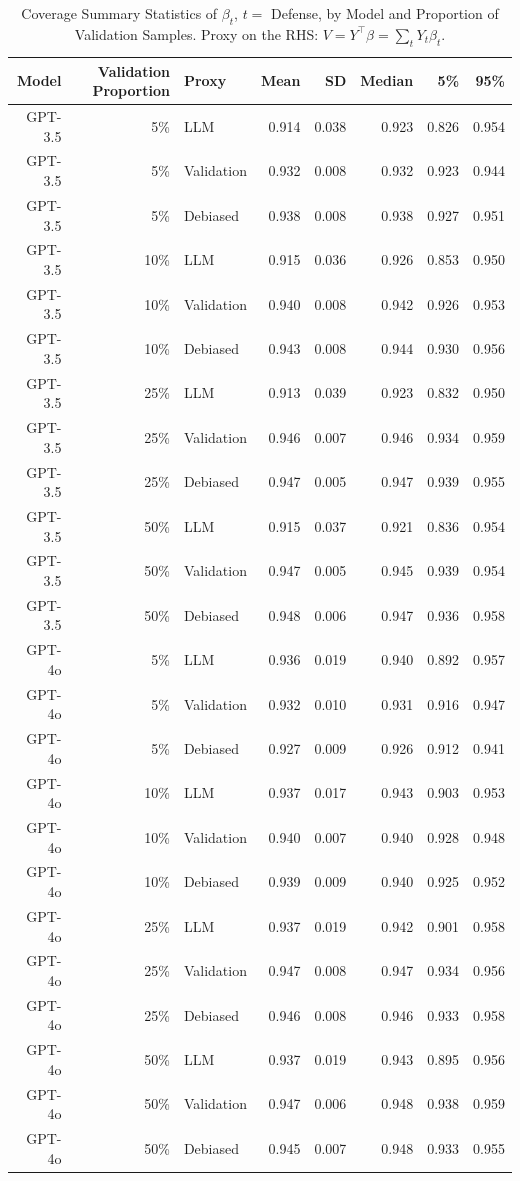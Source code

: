 \begin{table}

\caption{Coverage Summary Statistics of $\beta_{t}$, $t=$ Defense, by Model and Proportion of Validation Samples. Proxy on the RHS: $V = Y^\top \beta = \sum_{t} Y_t \beta_t$.}
\centering
\begin{tabular}[t]{rrlrrrrr}
\toprule
Model & Validation Proportion & Proxy & Mean & SD & Median & 5\% & 95\%\\
\midrule
GPT-3.5 & 5\% & LLM & 0.914 & 0.038 & 0.923 & 0.826 & 0.954\\
GPT-3.5 & 5\% & Validation & 0.932 & 0.008 & 0.932 & 0.923 & 0.944\\
GPT-3.5 & 5\% & Debiased & 0.938 & 0.008 & 0.938 & 0.927 & 0.951\\
GPT-3.5 & 10\% & LLM & 0.915 & 0.036 & 0.926 & 0.853 & 0.950\\
GPT-3.5 & 10\% & Validation & 0.940 & 0.008 & 0.942 & 0.926 & 0.953\\
GPT-3.5 & 10\% & Debiased & 0.943 & 0.008 & 0.944 & 0.930 & 0.956\\
GPT-3.5 & 25\% & LLM & 0.913 & 0.039 & 0.923 & 0.832 & 0.950\\
GPT-3.5 & 25\% & Validation & 0.946 & 0.007 & 0.946 & 0.934 & 0.959\\
GPT-3.5 & 25\% & Debiased & 0.947 & 0.005 & 0.947 & 0.939 & 0.955\\
GPT-3.5 & 50\% & LLM & 0.915 & 0.037 & 0.921 & 0.836 & 0.954\\
GPT-3.5 & 50\% & Validation & 0.947 & 0.005 & 0.945 & 0.939 & 0.954\\
GPT-3.5 & 50\% & Debiased & 0.948 & 0.006 & 0.947 & 0.936 & 0.958\\
GPT-4o & 5\% & LLM & 0.936 & 0.019 & 0.940 & 0.892 & 0.957\\
GPT-4o & 5\% & Validation & 0.932 & 0.010 & 0.931 & 0.916 & 0.947\\
GPT-4o & 5\% & Debiased & 0.927 & 0.009 & 0.926 & 0.912 & 0.941\\
GPT-4o & 10\% & LLM & 0.937 & 0.017 & 0.943 & 0.903 & 0.953\\
GPT-4o & 10\% & Validation & 0.940 & 0.007 & 0.940 & 0.928 & 0.948\\
GPT-4o & 10\% & Debiased & 0.939 & 0.009 & 0.940 & 0.925 & 0.952\\
GPT-4o & 25\% & LLM & 0.937 & 0.019 & 0.942 & 0.901 & 0.958\\
GPT-4o & 25\% & Validation & 0.947 & 0.008 & 0.947 & 0.934 & 0.956\\
GPT-4o & 25\% & Debiased & 0.946 & 0.008 & 0.946 & 0.933 & 0.958\\
GPT-4o & 50\% & LLM & 0.937 & 0.019 & 0.943 & 0.895 & 0.956\\
GPT-4o & 50\% & Validation & 0.947 & 0.006 & 0.948 & 0.938 & 0.959\\
GPT-4o & 50\% & Debiased & 0.945 & 0.007 & 0.948 & 0.933 & 0.955\\
\bottomrule
\end{tabular}
\end{table}
